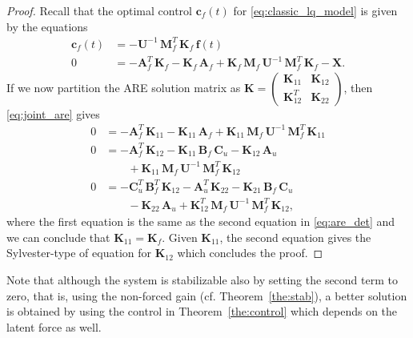 \documentclass[journal]{IEEEtran}
\begin{document}
\begin{proof}
Recall that the optimal control $\mathbf{c}_f(t)$ for \eqref{eq:classic_lq_model} is given by the equations
%
\begin{equation}
\begin{split}
  \mathbf{c}_f(t) &=
  - \mathbf{U}^{-1} \, \mathbf{M}_f^T \, \mathbf{K}_f \, \mathbf{f}(t) \\
  0 &=
    -\mathbf{A}_f^T \, \mathbf{K}_f - \mathbf{K}_f \, \mathbf{A}_f
  +  \mathbf{K}_f \, \mathbf{M}_f \, \mathbf{U}^{-1} \,
   \mathbf{M}_f^T \, \mathbf{K}_f - \mathbf{X}.
\end{split}
\label{eq:are_det}
\end{equation}
%
If we now partition the ARE solution matrix as $\mathbf{K} = \begin{pmatrix} \mathbf{K}_{11} & \mathbf{K}_{12} \\ \mathbf{K}_{12}^T & \mathbf{K}_{22} \end{pmatrix}$, then \eqref{eq:joint_are} gives
%
\begin{equation}
\begin{split}
  0
  &= -\mathbf{A}_f^T \, \mathbf{K}_{11} - \mathbf{K}_{11} \, \mathbf{A}_f
  + \mathbf{K}_{11} \, \mathbf{M}_f \, \mathbf{U}^{-1} \, \mathbf{M}_f^T \, \mathbf{K}_{11} \\
  0
  &= -\mathbf{A}_f^T \, \mathbf{K}_{12} - \mathbf{K}_{11} \, \mathbf{B}_f \, \mathbf{C}_u - \mathbf{K}_{12} \, \mathbf{A}_u
  \\
  &\qquad + \mathbf{K}_{11} \, \mathbf{M}_f \, \mathbf{U}^{-1} \, \mathbf{M}_f^T \, \mathbf{K}_{12} \\
  0
  &= -\mathbf{C}_u^T \, \mathbf{B}_f^T \, \mathbf{K}_{12} - \mathbf{A}_u^T \, \mathbf{K}_{22}
  - \mathbf{K}_{21} \, \mathbf{B}_f \, \mathbf{C}_u \\
  &\qquad  - \mathbf{K}_{22} \, \mathbf{A}_u
  + \mathbf{K}_{12}^T \, \mathbf{M}_f \, \mathbf{U}^{-1} \, \mathbf{M}_f^T \, \mathbf{K}_{12},
\end{split}
\end{equation}
%
where the first equation is the same as the second equation in \eqref{eq:are_det} and we can conclude that $\mathbf{K}_{11} = \mathbf{K}_f$. Given $\mathbf{K}_{11}$, the second equation gives the Sylvester-type of equation for $\mathbf{K}_{12}$ which concludes the proof.
\end{proof}
%
Note that although the system is stabilizable also by setting the second term to zero, that is, using the non-forced gain (cf. Theorem~\ref{the:stab}), a better solution is obtained by using the control in Theorem~\ref{the:control} which depends on the latent force as well.
\end{document}
